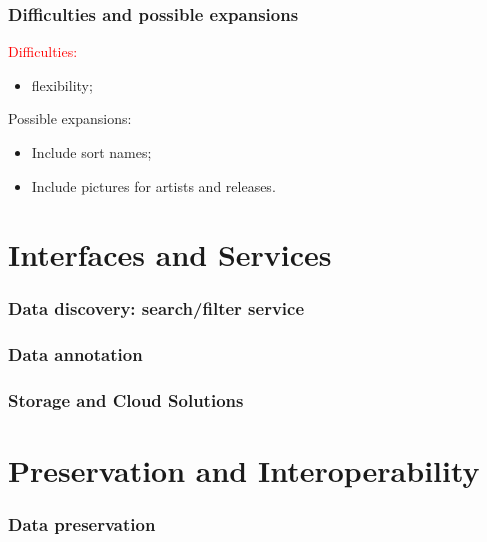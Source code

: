 \documentclass{beamer}
\begin{document}
  \begin{frame}
    \frametitle{Difficulties and possible expansions}
    
    \textcolor{red}{Difficulties:}
    
    \vspace{0.5em}
    
    \begin{itemize}
      \item flexibility;
      
    \end{itemize}

    \vspace{1em}
    
    Possible expansions:
    
    \vspace{0.5em}
    
    \begin{itemize}
      \item Include sort names;
      \item Include pictures for artists and releases.
    \end{itemize}

  \end{frame}



\section{Interfaces and Services}

  \begin{frame}
    \frametitle{Data discovery: search/filter service}
  \end{frame}



  \begin{frame}
    \frametitle{Data annotation}
  \end{frame}



  \begin{frame}
    \frametitle{Storage and Cloud Solutions}
  \end{frame}



\section{Preservation and Interoperability}

  \begin{frame}
    \frametitle{Data preservation}
  \end{frame}
\end{document}
